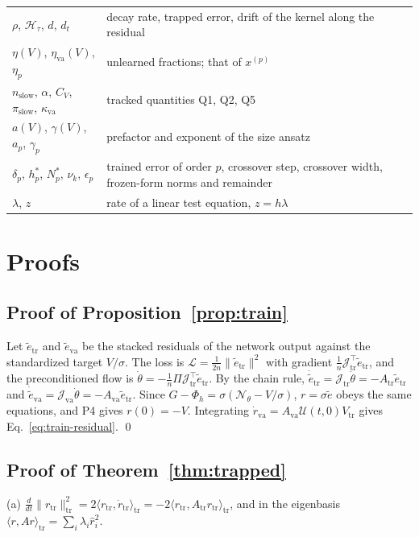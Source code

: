 \documentclass[11pt]{article}
\theoremstyle{definition}
\theoremstyle{remark}
\newcommand{\Net}{\mathcal{N}_\theta}
\newcommand{\Hard}{\mathcal{H}}
\newcommand{\tr}{\mathrm{tr}}
\newcommand{\va}{\mathrm{va}}
\newcommand{\Prop}{\mathcal{U}}
\newcommand{\Jac}{\mathcal{J}}
\newcommand{\slow}{\mathrm{slow}}
\begin{document}
\begin{table}[htbp]
\begin{tabular}{@{}p{}p{}@{}}
$\rho$, $\Hard_\tau$, $d$, $d_t$ & decay rate, trapped error, drift of the kernel along the residual \\
$\eta(V)$, $\eta_\va(V)$, $\eta_p$ & unlearned fractions; that of $x^{(p)}$ \\
$n_\slow$, $\alpha$, $C_V$, $\pi_\slow$, $\kappa_\va$ & tracked quantities Q1, Q2, Q5 \\
$a(V)$, $\gamma(V)$, $a_p$, $\gamma_p$ & prefactor and exponent of the size ansatz \\
$\delta_p$, $h_p^\ast$, $N_p^\ast$, $\nu_k$, $\epsilon_p$ & trained error of order $p$, crossover step, crossover width, frozen-form norms and remainder \\
$\lambda$, $z$ & rate of a linear test equation, $z = h\lambda$ \\
\bottomrule
\end{tabular}
\end{table}

\section{Proofs}\label{app:proofs}

\subsection{Proof of Proposition~\ref{prop:train}}\label{app:train}
Let $\tilde e_\tr$ and $\tilde e_\va$ be the stacked residuals of the network output against the standardized target $V/\sigma$.
The loss is $\mathcal L = \tfrac1{2n}\|\tilde e_\tr\|^2$ with gradient $\tfrac1n\Jac_\tr^\top\tilde e_\tr$, and the preconditioned flow is $\dot\theta = -\tfrac1n\Pi\Jac_\tr^\top\tilde e_\tr$.
By the chain rule, $\dot{\tilde e}_\tr = \Jac_\tr\dot\theta = -A_\tr\tilde e_\tr$ and $\dot{\tilde e}_\va = \Jac_\va\dot\theta = -A_\va\tilde e_\tr$.
Since $G - \Phi_h = \sigma(\Net - V/\sigma)$, $r = \sigma\tilde e$ obeys the same equations, and P4 gives $r(0) = -V$.
Integrating $\dot r_\va = A_\va\Prop(t,0)V_\tr$ gives Eq.~\eqref{eq:train-residual}. \qed

\subsection{Proof of Theorem~\ref{thm:trapped}}\label{app:trapped}
(a) $\frac{d}{dt}\|r_\tr\|_\tr^2 = 2\langle r_\tr,\dot r_\tr\rangle_\tr = -2\langle r_\tr, A_\tr r_\tr\rangle_\tr$, and in the eigenbasis $\langle r, Ar\rangle_\tr = \sum_i\lambda_i\hat r_i^2$.
\end{document}
